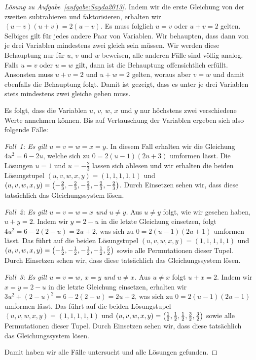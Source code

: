 \begin{proof}[Lösung zu Aufgabe~\ref{aufgabe:Sayda2013}]
	Indem wir die erste Gleichung von der zweiten subtrahieren und faktorisieren, erhalten wir $(u-v)(u+v)=2(u-v)$. Es muss folglich $u=v$ oder $u+v=2$ gelten. Selbiges gilt für jedes andere Paar von Variablen. Wir behaupten, dass dann von je drei Variablen mindestens zwei gleich sein müssen. Wir werden diese Behauptung nur für $u$, $v$ und $w$ beweisen, alle anderen Fälle sind völlig analog. Falls $u=v$ oder $u=w$ gilt, dann ist die Behauptung offensichtlich erfüllt. Ansonsten muss $u+v=2$ und $u+w=2$ gelten, woraus aber $v=w$ und damit ebenfalls die Behauptung folgt. Damit ist gezeigt, dass es unter je drei Variablen stets mindestens zwei gleiche geben muss.
	
	Es folgt, dass die Variablen $u$, $v$, $w$, $x$ und $y$ nur höchstens zwei verschiedene Werte annehmen können. Bis auf Vertauschung der Variablen ergeben sich also folgende Fälle:
	
	\emph{Fall~1: Es gilt $u=v=w=x=y$.} In diesem Fall erhalten wir die Gleichung $4u^2=6-2u$, welche sich zu $0=2(u-1)(2u+3)$ umformen lässt. Die Lösungen $u=1$ und $u=-\frac23$ lassen sich ablesen und wir erhalten die beiden Lösungstupel $(u,v,w,x,y)=(1,1,1,1,1)$ und $(u,v,w,x,y)=\parens[\big]{-\frac23,-\frac23,-\frac23,-\frac23,-\frac23}$. Durch Einsetzen sehen wir, dass diese tatsächlich das Gleichungssystem lösen.
	
	\emph{Fall~2: Es gilt $u=v=w=x$ und $u\neq y$.} Aus $u\neq y$ folgt, wie wir gesehen haben, $u+y=2$. Indem wir $y=2-u$ in die letzte Gleichung einsetzen, folgt $4u^2=6-2(2-u)=2u+2$, was sich zu $0=2(u-1)(2u+1)$ umformen lässt. Das führt auf die beiden Lösungstupel $(u,v,w,x,y)=(1,1,1,1,1)$ und $(u,v,w,x,y)=\parens[\big]{-\frac12,-\frac12,-\frac12,-\frac12,\frac52}$ sowie alle Permutationen dieser Tupel. Durch Einsetzen sehen wir, dass diese tatsächlich das Gleichungssystem lösen.
	
	\emph{Fall~3: Es gilt $u=v=w$, $x=y$ und $u\neq x$.} Aus $u\neq x$ folgt $u+x=2$. Indem wir $x=y=2-u$ in die letzte Gleichung einsetzen, erhalten wir $3u^2+(2-u)^2=6-2(2-u)=2u+2$, was sich zu $0=2(u-1)(2u-1)$ umformen lässt. Das führt auf die beiden Lösungstupel $(u,v,w,x,y)=(1,1,1,1,1)$ und $(u,v,w,x,y)=\parens[\big]{\frac12,\frac12,\frac12,\frac32,\frac32}$ sowie alle Permutationen dieser Tupel. Durch Einsetzen sehen wir, dass diese tatsächlich das Gleichungssystem lösen.
	
	Damit haben wir alle Fälle untersucht und alle Lösungen gefunden.
\end{proof}
